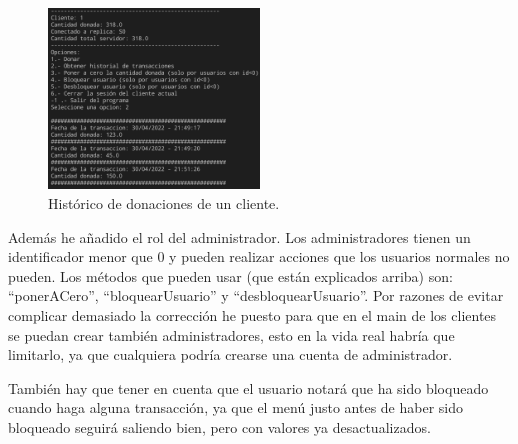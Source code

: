 \documentclass{article}
\begin{document}
\begin{figure}[H]
    \centering
    \includegraphics[width=0.5\textwidth]{imagenes/historico.png}
    \caption{Histórico de donaciones de un cliente.}
\end{figure}

Además he añadido el rol del administrador. Los administradores tienen un identificador menor que 0 y pueden realizar acciones que los usuarios normales no pueden. Los métodos que pueden usar (que están explicados arriba) son: ``ponerACero'', ``bloquearUsuario'' y ``desbloquearUsuario''. Por razones de evitar complicar demasiado la corrección he puesto para que en el main de los clientes se puedan crear también administradores, esto en la vida real habría que limitarlo, ya que cualquiera podría crearse una cuenta de administrador.

\bigskip

También hay que tener en cuenta que el usuario notará que ha sido bloqueado cuando haga alguna transacción, ya que el menú justo antes de haber sido bloqueado seguirá saliendo bien, pero con valores ya desactualizados.
\end{document}
